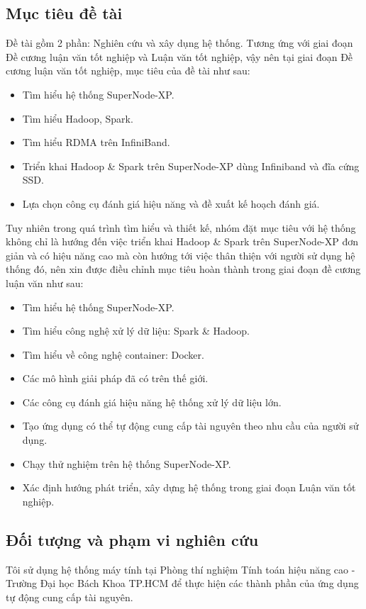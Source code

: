 \documentclass[11pt,a4paper]{article}
\begin{document}
\subsection{Mục tiêu đề tài}
Đề tài gồm 2 phần: Nghiên cứu và xây dụng hệ thống. Tương ứng với giai đoạn Đề cương luận văn tốt nghiệp và Luận văn tốt nghiệp, vậy nên tại giai đoạn Đề cương luận văn tốt nghiệp, mục tiêu của đề tài như sau:
\begin{itemize}
    \item Tìm hiểu hệ thống SuperNode-XP.
    \item Tìm hiểu Hadoop, Spark.
    \item Tìm hiểu RDMA trên InfiniBand.
    \item Triển khai Hadoop \& Spark trên SuperNode-XP dùng Infiniband và đĩa cứng SSD.
    \item Lựa chọn công cụ đánh giá hiệu năng và đề xuất kế hoạch đánh giá.
\end{itemize}
Tuy nhiên trong quá trình tìm hiểu và thiết kế, nhóm đặt mục tiêu với hệ thống không chỉ là hướng đến việc triển khai Hadoop \& Spark trên SuperNode-XP đơn giản và có hiệu năng cao mà còn hướng tới việc thân thiện với người sử dụng hệ thống đó, nên xin được điều chỉnh mục tiêu hoàn thành trong giai đoạn đề cương luận văn như sau:
\begin{itemize}
    \item Tìm hiểu hệ thống SuperNode-XP.
    \item Tìm hiểu công nghệ xử lý dữ liệu: Spark \& Hadoop.
    \item Tìm hiểu về công nghệ container: Docker.
    \item Các mô hình giải pháp đã có trên thế giới.
    \item Các công cụ đánh giá hiệu năng hệ thống xử lý dữ liệu lớn.
    \item Tạo ứng dụng có thể tự động cung cấp tài nguyên theo nhu cầu của người sử dụng.
    \item Chạy thử nghiệm trên hệ thống SuperNode-XP.
    \item Xác định hướng phát triển, xây dựng hệ thống trong giai đoạn Luận văn tốt nghiệp.
\end{itemize}

\subsection{Đối tượng và phạm vi nghiên cứu}
Tôi sử dụng hệ thống máy tính tại Phòng thí nghiệm Tính toán hiệu năng cao - Trường Đại học Bách Khoa TP.HCM để thực hiện các thành phần của ứng dụng tự động cung cấp tài nguyên.
\end{document}
